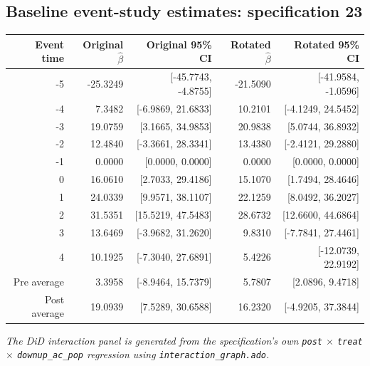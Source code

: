 \documentclass[10pt]{article}
\begin{document}
\subsection*{Baseline event-study estimates: specification 23}
\begin{center}
\scriptsize
\begin{tabular}{r rr rr}
\toprule
Event time & Original $\hat\beta$ & Original 95\% CI & Rotated $\hat\beta$ & Rotated 95\% CI \\
\midrule
-5 & -25.3249 & [-45.7743, -4.8755] & -21.5090 & [-41.9584, -1.0596] \\
-4 & 7.3482 & [-6.9869, 21.6833] & 10.2101 & [-4.1249, 24.5452] \\
-3 & 19.0759 & [3.1665, 34.9853] & 20.9838 & [5.0744, 36.8932] \\
-2 & 12.4840 & [-3.3661, 28.3341] & 13.4380 & [-2.4121, 29.2880] \\
-1 & 0.0000 & [0.0000, 0.0000] & 0.0000 & [0.0000, 0.0000] \\
0 & 16.0610 & [2.7033, 29.4186] & 15.1070 & [1.7494, 28.4646] \\
1 & 24.0339 & [9.9571, 38.1107] & 22.1259 & [8.0492, 36.2027] \\
2 & 31.5351 & [15.5219, 47.5483] & 28.6732 & [12.6600, 44.6864] \\
3 & 13.6469 & [-3.9682, 31.2620] & 9.8310 & [-7.7841, 27.4461] \\
4 & 10.1925 & [-7.3040, 27.6891] & 5.4226 & [-12.0739, 22.9192] \\
\midrule
Pre average & 3.3958 & [-8.9464, 15.7379] & 5.7807 & [2.0896, 9.4718] \\
Post average & 19.0939 & [7.5289, 30.6588] & 16.2320 & [-4.9205, 37.3844] \\
\bottomrule
\end{tabular}
\end{center}
\medskip
\textit{The DiD interaction panel is generated from the specification's own \texttt{post} $\times$ \texttt{treat} $\times$ \texttt{downup\_ac\_pop} regression using \texttt{interaction\_graph.ado}.}
\clearpage
\end{document}
